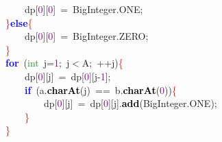 {{\mbox{}\ \ \ \ \ \ \ \ \ \ \ \ \ \ \ \ \ \ \ \ dp\textcolor{BrickRed}{[}\textcolor{Purple}{0}\textcolor{BrickRed}{][}\textcolor{Purple}{0}\textcolor{BrickRed}{]}\ \textcolor{BrickRed}{=}\ BigInteger\textcolor{BrickRed}{.}ONE\textcolor{BrickRed}{;} \\
\mbox{}\ \ \ \ \ \ \ \ \ \ \ \ \ \ \ \ \textcolor{Red}{\}}\textbf{\textcolor{Blue}{else}}\textcolor{Red}{\{} \\
\mbox{}\ \ \ \ \ \ \ \ \ \ \ \ \ \ \ \ \ \ \ \ dp\textcolor{BrickRed}{[}\textcolor{Purple}{0}\textcolor{BrickRed}{][}\textcolor{Purple}{0}\textcolor{BrickRed}{]}\ \textcolor{BrickRed}{=}\ BigInteger\textcolor{BrickRed}{.}ZERO\textcolor{BrickRed}{;} \\
\mbox{}\ \ \ \ \ \ \ \ \ \ \ \ \ \ \ \ \textcolor{Red}{\}} \\
\mbox{}\ \ \ \ \ \ \ \ \ \ \ \ \ \ \ \ \textbf{\textcolor{Blue}{for}}\ \textcolor{BrickRed}{(}\textcolor{ForestGreen}{int}\ j\textcolor{BrickRed}{=}\textcolor{Purple}{1}\textcolor{BrickRed}{;}\ j\textcolor{BrickRed}{$<$}A\textcolor{BrickRed}{;}\ \textcolor{BrickRed}{++}j\textcolor{BrickRed}{)}\textcolor{Red}{\{} \\
\mbox{}\ \ \ \ \ \ \ \ \ \ \ \ \ \ \ \ \ \ \ \ dp\textcolor{BrickRed}{[}\textcolor{Purple}{0}\textcolor{BrickRed}{][}j\textcolor{BrickRed}{]}\ \textcolor{BrickRed}{=}\ dp\textcolor{BrickRed}{[}\textcolor{Purple}{0}\textcolor{BrickRed}{][}j\textcolor{BrickRed}{-}\textcolor{Purple}{1}\textcolor{BrickRed}{];} \\
\mbox{}\ \ \ \ \ \ \ \ \ \ \ \ \ \ \ \ \ \ \ \ \textbf{\textcolor{Blue}{if}}\ \textcolor{BrickRed}{(}a\textcolor{BrickRed}{.}\textbf{\textcolor{Black}{charAt}}\textcolor{BrickRed}{(}j\textcolor{BrickRed}{)}\ \textcolor{BrickRed}{==}\ b\textcolor{BrickRed}{.}\textbf{\textcolor{Black}{charAt}}\textcolor{BrickRed}{(}\textcolor{Purple}{0}\textcolor{BrickRed}{))}\textcolor{Red}{\{} \\
\mbox{}\ \ \ \ \ \ \ \ \ \ \ \ \ \ \ \ \ \ \ \ \ \ \ \ dp\textcolor{BrickRed}{[}\textcolor{Purple}{0}\textcolor{BrickRed}{][}j\textcolor{BrickRed}{]}\ \textcolor{BrickRed}{=}\ dp\textcolor{BrickRed}{[}\textcolor{Purple}{0}\textcolor{BrickRed}{][}j\textcolor{BrickRed}{].}\textbf{\textcolor{Black}{add}}\textcolor{BrickRed}{(}BigInteger\textcolor{BrickRed}{.}ONE\textcolor{BrickRed}{);} \\
\mbox{}\ \ \ \ \ \ \ \ \ \ \ \ \ \ \ \ \ \ \ \ \textcolor{Red}{\}} \\
\mbox{}\ \ \ \ \ \ \ \ \ \ \ \ \ \ \ \ \textcolor{Red}{\}} \\
}}
